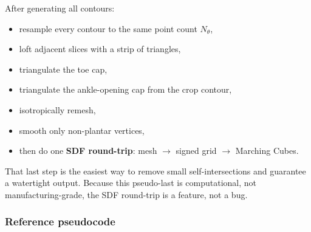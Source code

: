 \documentclass[
  10.5pt,
]{article}
\providecommand{\tightlist}{%
  \setlength{\itemsep}{0pt}\setlength{\parskip}{0pt}}
\begin{document}
After generating all contours:

\begin{itemize}
\tightlist
\item
  resample every contour to the same point count \(N_\theta\),
\item
  loft adjacent slices with a strip of triangles,
\item
  triangulate the toe cap,
\item
  triangulate the ankle-opening cap from the crop contour,
\item
  isotropically remesh,
\item
  smooth only non-plantar vertices,
\item
  then do one \textbf{SDF round-trip}: mesh \(\rightarrow\) signed grid
  \(\rightarrow\) Marching Cubes.
\end{itemize}

That last step is the easiest way to remove small self-intersections and
guarantee a watertight output. Because this pseudo-last is
computational, not manufacturing-grade, the SDF round-trip is a feature,
not a bug.

\subsubsection{Reference pseudocode}\label{reference-pseudocode}
\end{document}
